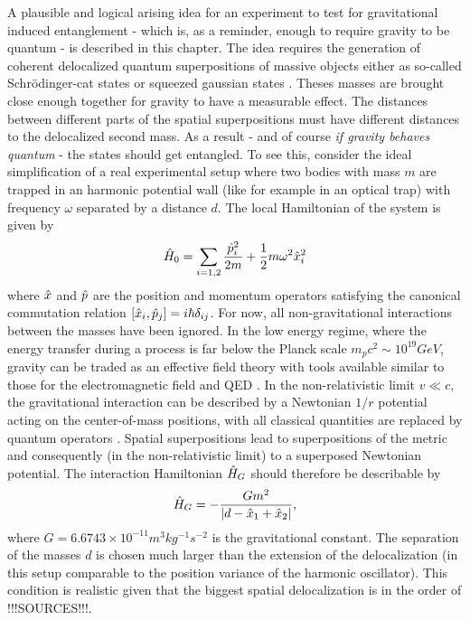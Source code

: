 A plausible and logical arising idea for an experiment to test for gravitational induced entanglement - which is, as a reminder, enough to require gravity to be quantum - is described in this chapter.
The idea requires the generation of coherent delocalized quantum superpositions of massive objects either as so-called Schrödinger-cat states or squeezed gaussian states \cite{Bose_2017, Pedernales_2023}. Theses masses are brought close enough together for gravity to have a measurable effect. The distances between different parts of the spatial superpositions must have different distances to the delocalized second mass. As a result - and of course \textit{if gravity behaves quantum} - the states should get entangled.
To see this, consider the ideal simplification of a real experimental setup where two bodies with mass $m$ are trapped in an harmonic potential wall (like for example in an optical trap) with frequency $\omega$ separated by a distance $d$. The local Hamiltonian of the system is given by
\begin{equation}
  \hat{H}_0 = \sum_{i = 1,2} \frac{\hat{p}_i^2}{2m} + \frac{1}{2}m\omega^2\hat{x}^2_i
\end{equation}
where $\hat{x}$ and $\hat{p}$ are the position and momentum operators satisfying the canonical commutation relation $[\hat{x}_i, \hat{p}_j] = i\hbar \delta_{ij}$.
For now, all non-gravitational interactions between the masses have been ignored. 
In the low energy regime, where the energy transfer during a process is far below the Planck scale $m_p c^2 \sim 10^{19}\si{GeV}$, gravity can be traded as an effective field theory with tools available similar to those for the electromagnetic field and QED \cite{Carney_2018}. 
In the non-relativistic limit $v \ll c$, the gravitational interaction can be described by a Newtonian $1/r$ potential acting on the center-of-mass positions, with all classical quantities are replaced by quantum operators \cite{Carney_2018,Pedernales_2023,Christodoulou_2022}. 
Spatial superpositions lead to superpositions of the metric and consequently (in the non-relativistic limit) to a superposed Newtonian potential.
The interaction Hamiltonian $\hat{H}_G$ should therefore be describable by
\begin{equation}
  \hat{H}_G = - \frac{Gm^2}{\left\lvert d - \hat{x}_1 + \hat{x}_2\right\rvert} ,
\end{equation}
where $G=6.6743 \times 10^{-11} \si{m^3 kg^{-1} s^{-2}}$ is the gravitational constant. The separation of the masses $d$ is chosen much larger than the extension of the delocalization (in this setup comparable to the position variance of the harmonic oscillator). This condition is realistic given that the biggest spatial delocalization is in the order of !!!SOURCES!!!.
